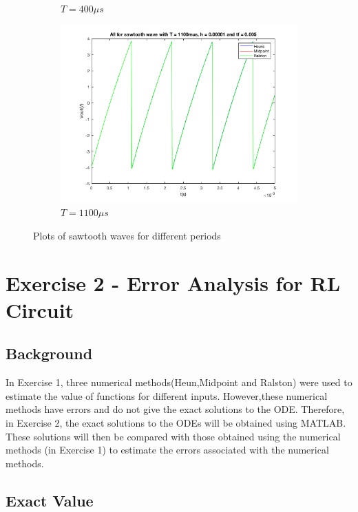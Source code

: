\documentclass[11pt,a4paper]{article}
\begin{document}
\begin{figure}[h]
\begin{subfigure}{.5\textwidth}
          \caption{$T = 400\mu s$}
          \label{fig:sfig11}
        \end{subfigure}
        \begin{subfigure}{.5\textwidth}
          \centering
          \includegraphics[width=.8\linewidth]{Ex1_Figs/sawtooth1100.png}
          \caption{$T = 1100\mu s$}
          \label{fig:sfig12}
        \end{subfigure}
        \caption{Plots of sawtooth waves for different periods}
        \label{fig:test6}
    \end{figure}

\pagebreak

\section{Exercise 2 - Error Analysis for RL Circuit}\vspace{-1mm}

\subsection{Background}

\vspace{-2mm}In Exercise 1, three numerical methods(Heun,Midpoint and Ralston) were used to estimate the value of functions for different inputs. However,these numerical methods have errors and do not give the exact solutions to the ODE. Therefore, in Exercise 2, the exact solutions to the ODEs will be obtained using MATLAB. These solutions will then be compared with those obtained using the numerical methods (in Exercise 1) to estimate the errors associated with the numerical methods.

\subsection{Exact Value}
\end{document}
